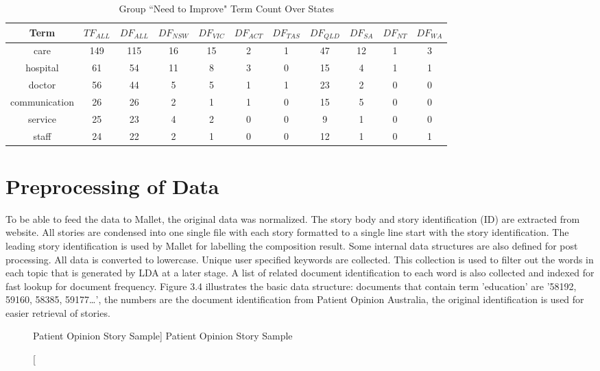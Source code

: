 \documentclass[11pt,twoside]{report}
\begin{document}
\begin{table}[h]
\tiny
\caption{Group ``Need to Improve" Term Count Over States}
\centering
\begin{tabular}{| c | c | c | c | c | c | c | c |c | c | c |}
\hline\hline
Term & $TF_{ALL}$ & $DF_{ALL}$ & $DF_{NSW}$ & $DF_{VIC}$ & $DF_{ACT}$ & $DF_{TAS}$ & $DF_{QLD}$ & $DF_{SA}$ & $DF_{NT}$ & $DF_{WA}$ \\
\hline
care & 149 & 115 & 16 & 15 & 2 & 1 & 47 & 12 & 1 & 3 \\
\hline
hospital & 61 & 54 & 11 & 8 & 3 & 0 & 15 & 4 & 1 & 1 \\
\hline
doctor & 56 & 44 & 5 & 5 & 1 & 1 & 23 & 2 & 0 & 0 \\
\hline
communication & 26 & 26 & 2 & 1 & 1 & 0 & 15 & 5 & 0 & 0 \\
\hline
service & 25 & 23 & 4 & 2 & 0 & 0 & 9 & 1 & 0 & 0 \\
\hline
staff & 24 & 22 & 2 & 1 & 0 & 0 & 12 & 1 & 0 & 1 \\
\hline
\end{tabular}
\label{table:ImproveCount}
\end{table}

\section{Preprocessing of Data}

To be able to feed the data to Mallet, the original data was normalized. The story body and story identification (ID) are extracted from website. All stories are condensed into one single file with each story formatted to a single line start with the story identification. The leading story identification is used by Mallet for labelling the composition result. Some internal data structures are also defined for post processing. All data is converted to lowercase. Unique user specified keywords are collected. This collection is used to filter out the words in each topic that is generated by LDA at a later stage. A list of related document identification to each word is also collected and indexed for fast lookup for document frequency. Figure 3.4 illustrates the basic data structure: documents that contain term 'education' are '58192, 59160, 58385, 59177…', the numbers are the document identification from Patient Opinion Australia, the original identification is used for easier retrieval of stories.

\begin{figure}[tp]
    \begin{center}
    \caption
    [Patient Opinion Story Sample]
    {
    Patient Opinion Story Sample
    \label{Figure4}
    }
    \end{center}
\end{figure}
\end{document}
